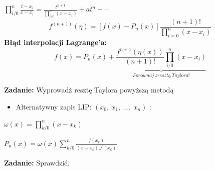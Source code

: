  \begin{frame}


$\displaystyle \prod_{i/0}^{n}\frac{t-x_{i}}{x-x_{i}}=\frac{t^{n+1}}{\prod_{i/0}^{n}(x-x_{i})}+at^{n}+\cdots$
$$
f^{(n+1)}(\eta)=[f(x)-P_{n}(x)]\frac{(n+1)!}{\prod_{i=0}^{n}(x-x_{i})}
$$
\textbf{Błąd interpolacji Lagrange'a:}
$$
f(x)=P_{n}(x)+\underbrace{\frac{f^{n+1}(\eta(x))}{(n+1)!}\prod_{i/0}^{n}(x-x_{i})}_{Porównaj\: z resztą\: Taylora!}
$$


\textbf{Zadanie:} Wyprowadź resztę Taylora powyższą metodą \\
\end{frame}

\begin{frame}
\begin{itemize}
\item Alternatywny zapis LIP: $(x_{0},\ x_{1},\ \ldots,\ x_{n})$ :
\end{itemize}
$\displaystyle \omega(x)=\prod_{k/0}^{n}(x-x_{k})$

$P_{n}(x)=\displaystyle \omega(x)\sum_{k/0}^{n}\frac{f(x_{k})}{(x-x_{k})\omega ^{'}(x_{k})}$ \\
\vspace{5mm}

\textbf{Zadanie:} Sprawdzić.

 \end{frame}
